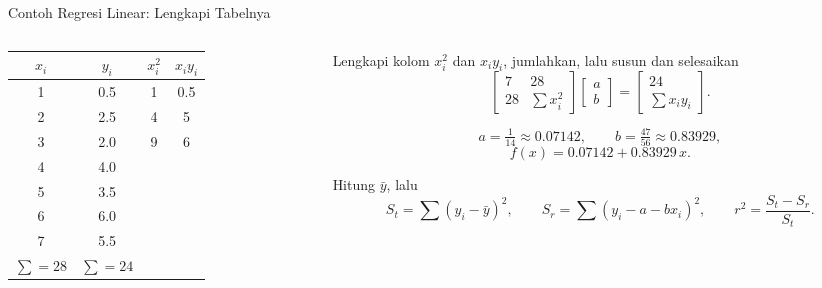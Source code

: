 \documentclass[aspectratio=169,10pt]{beamer}
\begin{document}
\begin{frame}{Contoh Regresi Linear: Lengkapi Tabelnya}
\tiny
\begin{columns}[T,totalwidth=\textwidth]
\begin{column}{.44\textwidth}
\renewcommand{\arraystretch}{1.18}
\begin{tabular}{c c c c}
\toprule
$x_i$ & $y_i$ & $x_i^2$ & $x_iy_i$\\
\midrule
1 & 0.5 & 1 & 0.5\\
2 & 2.5 & 4 & 5\\
3 & 2.0 & 9 & 6\\
4 & 4.0 & \phantom{00} & \phantom{000}\\
5 & 3.5 & & \\
6 & 6.0 & & \\
7 & 5.5 & & \\
\midrule
$\sum=28$ & $\sum=24$ & & \\
\bottomrule
\end{tabular}
\end{column}
\begin{column}{.52\textwidth}
\begin{bluebox}
Lengkapi kolom $x_i^2$ dan $x_iy_i$, jumlahkan, lalu susun dan selesaikan
\[
\begin{bmatrix}7 & 28\\ 28 & \sum x_i^2\end{bmatrix}
\begin{bmatrix}a\\ b\end{bmatrix}=
\begin{bmatrix}24\\ \sum x_iy_i\end{bmatrix}.
\]
\end{bluebox}
\begin{orangebox}
\[
a=\tfrac{1}{14}\approx0.07142,\qquad b=\tfrac{47}{56}\approx0.83929,
\]
\[
f(x)=0.07142+0.83929\,x.
\]
\end{orangebox}
\begin{greenbox}[Lanjutan]
Hitung $\bar{y}$, lalu
\[
S_t=\sum(y_i-\bar{y})^2,\qquad S_r=\sum(y_i-a-bx_i)^2,\qquad r^2=\frac{S_t-S_r}{S_t}.
\]
\end{greenbox}
\end{column}
\end{columns}
\end{frame}
\end{document}
